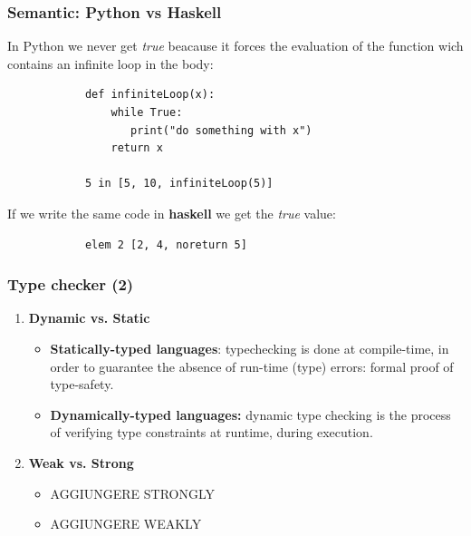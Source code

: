 \documentclass[xcolor ={table,usenames,dvipsnames}]{beamer}
\theoremstyle{definition}
\begin{document}
	\begin{frame}[fragile]
		\frametitle{Semantic: Python vs Haskell}
		In Python we never get \textit{true} beacause  it forces the evaluation of the function wich contains an infinite loop in the body:
		\begin{lstlisting}
			def infiniteLoop(x):
			    while True:
		           print("do something with x")
		        return x
				
			5 in [5, 10, infiniteLoop(5)]
		\end{lstlisting}
		If we write the same code in \textbf{haskell} we get the \textit{true} value:
		\begin{lstlisting}
			elem 2 [2, 4, noreturn 5]
		\end{lstlisting}
	\end{frame}

		

	\begin{frame}
		\frametitle{Type checker (2) }
		\begin{enumerate}
			\item \textbf{Dynamic vs. Static}\begin{itemize}
				\item \textbf{Statically-typed languages}: typechecking is done at
				compile-time, in order to guarantee the absence of run-time (type) errors:
				formal proof of type-safety.
				\item \textbf{Dynamically-typed languages:} dynamic
				type checking is the process of verifying type constraints at runtime,
				during execution.
			\end{itemize}
			\item \textbf{Weak vs. Strong}\begin{itemize}
				\item AGGIUNGERE STRONGLY
				\item AGGIUNGERE WEAKLY	
			\end{itemize}
		\end{enumerate}
	\end{frame}
\end{document}

